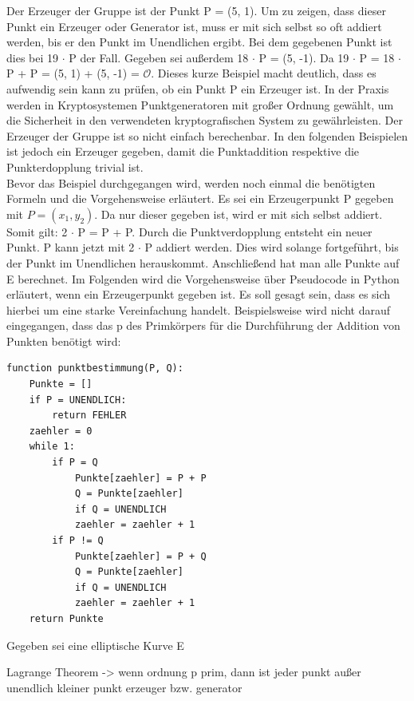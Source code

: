 Der Erzeuger der Gruppe ist der Punkt P = (5, 1). Um zu zeigen, dass dieser Punkt ein Erzeuger oder Generator ist, muss er mit sich selbst so oft addiert werden, bis er den Punkt im Unendlichen ergibt. Bei dem gegebenen Punkt ist dies bei 19 $\cdot$ P der Fall. Gegeben sei außerdem 18 $\cdot$ P = (5, -1). Da 19 $\cdot$ P = 18 $\cdot$ P + P = (5, 1) + (5, -1) = $\mathcal O$. Dieses kurze Beispiel macht deutlich, dass es aufwendig sein kann zu prüfen, ob ein Punkt P ein Erzeuger ist. In der Praxis werden in Kryptosystemen Punktgeneratoren mit großer Ordnung gewählt, um die Sicherheit in den verwendeten kryptografischen System zu gewährleisten. Der Erzeuger der Gruppe ist so nicht einfach berechenbar. In den folgenden Beispielen ist jedoch ein Erzeuger gegeben, damit die Punktaddition respektive die Punkterdopplung trivial ist.\\

Bevor das Beispiel durchgegangen wird, werden noch einmal die benötigten Formeln und die Vorgehensweise erläutert. Es sei ein Erzeugerpunkt P gegeben mit $P = (x_1, y_2)$. Da nur dieser gegeben ist, wird er mit sich selbst addiert. Somit gilt: 2 $\cdot$ P = P + P. Durch die Punktverdopplung entsteht ein neuer Punkt. P kann jetzt mit 2 $\cdot$ P addiert werden. Dies wird solange fortgeführt, bis der Punkt im Unendlichen herauskommt. Anschließend hat man alle Punkte auf E berechnet. Im Folgenden wird die Vorgehensweise über Pseudocode in Python erläutert, wenn ein Erzeugerpunkt gegeben ist. Es soll gesagt sein, dass es sich hierbei um eine starke Vereinfachung handelt. Beispielsweise wird nicht darauf eingegangen, dass das p des Primkörpers für die Durchführung der Addition von Punkten benötigt wird:\\

\begin{lstlisting}[caption={Punktberechnung in Python}, captionpos=b]
function punktbestimmung(P, Q):
	Punkte = []	
	if P = UNENDLICH:
		return FEHLER		
	zaehler = 0
	while 1:
		if P = Q
			Punkte[zaehler] = P + P
			Q = Punkte[zaehler]
			if Q = UNENDLICH
			zaehler = zaehler + 1	
		if P != Q
			Punkte[zaehler] = P + Q
			Q = Punkte[zaehler]
			if Q = UNENDLICH
			zaehler = zaehler + 1
	return Punkte
\end{lstlisting}


Gegeben sei eine elliptische Kurve E





Lagrange Theorem -> wenn ordnung p prim, dann ist jeder punkt außer unendlich kleiner punkt erzeuger bzw. generator



